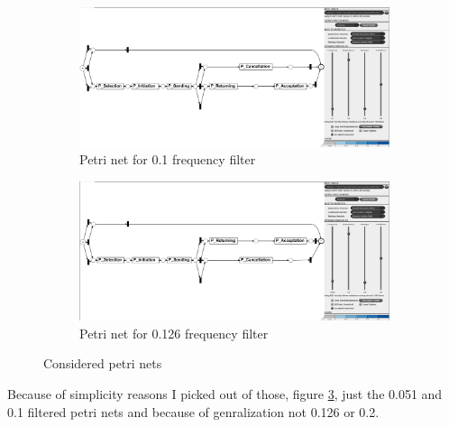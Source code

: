 \begin{figure}[!htbp]
\begin{subfigure}{.4\textwidth}
  \includegraphics[width=\linewidth]{P_DirectlyFollowedFreq0-1.PNG}
  \caption{Petri net for 0.1 frequency filter}
  \label{fig:P_DFG0-1}
\end{subfigure}
\begin{subfigure}{.4\textwidth}
  \centering
  \includegraphics[width=\linewidth]{P_DirectlyFollowedFreq0-126.PNG}
  \caption{Petri net for 0.126 frequency filter}
  \label{fig:P_DFG0-126}
\end{subfigure}
\caption{Considered petri nets}
\label{fig:P_Direct}
\end{figure}

Because of simplicity reasons I picked out of those, figure \ref{fig:P_Direct}, just the 0.051 and 0.1 filtered petri nets and because of genralization not 0.126 or 0.2.


